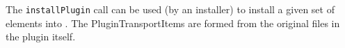 The \verb+installPlugin+ call can be used (by an installer) to install a given
set of elements into \Rapture. The PluginTransportItems are formed from the original
files in the plugin itself.
